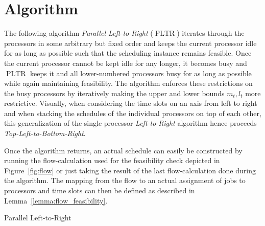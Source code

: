 \documentclass[a4paper]{article}
\DeclareMathOperator{\PLTR}{PLTR}
\DeclareMathOperator{\keepidle}{keepIdle}
\DeclareMathOperator{\keepbusy}{keepBusy}
\begin{document}

\section{Algorithm}

The following algorithm \emph{Parallel Left-to-Right} ($\PLTR$) iterates through the processors in some arbitrary but fixed order and keeps the current processor idle for as long as possible such that the scheduling instance remains feasible.
Once the current processor cannot be kept idle for any longer, it becomes busy and $\PLTR$ keeps it and all lower-numbered processors busy for as long as possible while again maintaining feasibility.
The algorithm enforces these restrictions on the busy processors by iteratively making the upper and lower bounds $m_t, l_t$ more restrictive.
Visually, when considering the time slots on an axis from left to right and when stacking the schedules of the individual processors on top of each other, this generalization of the single processor \emph{Left-to-Right} algorithm hence proceeds \emph{Top-Left-to-Bottom-Right}.

Once the algorithm returns, an actual schedule can easily be constructed by running the flow-calculation used for the feasibility check depicted in Figure~\ref{fig:flow} or just taking the result of the last flow-calculation done during the algorithm.
The mapping from the flow to an actual assignment of jobs to processors and time slots can then be defined as described in Lemma~\ref{lemma:flow_feasibility}.

\begin{algorithm}[H]
\caption{Parallel Left-to-Right}\label{alg:pltr}
\begin{algorithmic}
      \State{$t \gets $\Call{$\keepidle$}{$k, t$}}
      \State{$t \gets $\Call{$\keepbusy$}{$k, t$}}
    \EndWhile{}
  \EndFor{}
\end{algorithmic}
\end{algorithm}
\end{document}
